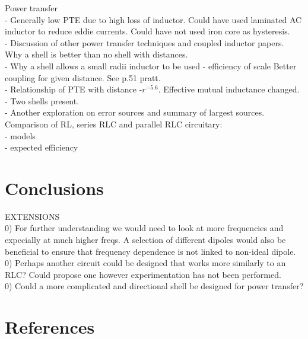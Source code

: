 \documentclass[11pt]{iopart}
\begin{document}
Power transfer \\
- Generally low PTE due to high loss of inductor.  Could have used
laminated AC inductor to reduce eddie currents.  Could have not used
iron core as hysteresis. \\
- Discussion of other power transfer techniques and coupled inductor
papers. Why a shell is better than no shell with distances. \\
- Why a shell allows a small radii inductor to be used - efficiency of scale
Better coupling for given distance. See p.51 pratt. \\
- Relationship of PTE with distance -$r^{-5.6}$. Effective mutual
inductance changed. \\
- Two shells present. \\
- Another exploration on error sources and summary of largest
sources.\\

Comparison of RL, series RLC and parallel RLC circuitary: \\
- models \\
- expected efficiency \\

\section{Conclusions}
EXTENSIONS \\
0) For further understanding we would need to look at more frequencies
and expecially at much higher freqs. A selection of different dipoles
would also be beneficial to ensure that frequency dependence is not
linked to non-ideal dipole.\\

0) Perhaps another circuit could be designed that works more similarly
to an RLC? Could propose one however experimentation has not been
performed.\\

0) Could a more complicated and directional shell be designed for
power transfer?\\
\section{References}
\end{document}
